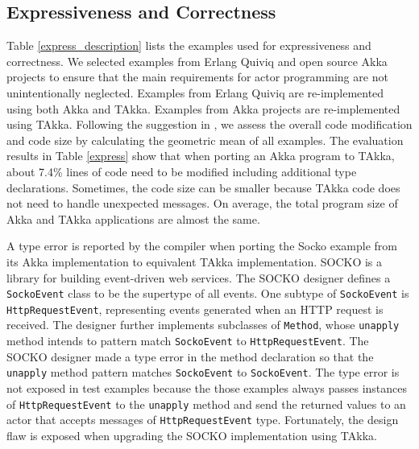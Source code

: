 \subsection{Expressiveness and Correctness}
\label{expressiveness}
Table \ref{express_description} lists the examples used for expressiveness and 
correctness.  We selected examples from Erlang Quiviq \cite{quviq}
and open source Akka projects to ensure that the main requirements for actor 
programming are not unintentionally neglected.  Examples from Erlang 
Quiviq are re-implemented using both Akka and TAkka.  Examples from 
Akka projects are re-implemented using TAkka.  Following the suggestion in  
\cite{HePa06}, we assess the overall code modification and code 
size by calculating the geometric mean of all examples. The evaluation results 
in Table \ref{express} show that when porting an Akka program to TAkka, about 
7.4\% lines of code need to be modified including additional type declarations. 
Sometimes, the code size can be smaller because TAkka code does not 
need to handle unexpected messages.  On average, the total program size 
of Akka and TAkka applications are almost the same.

A type error is reported by the compiler when porting the Socko example 
\cite{SOCKO} from its Akka implementation to equivalent TAkka implementation.
SOCKO is a library for building event-driven web services.  The SOCKO designer
defines a {\tt SockoEvent} class to be the supertype of all events.  One
subtype of {\tt SockoEvent} is {\tt HttpRequestEvent}, representing events
generated when an HTTP request is received. The designer further implements
subclasses of {\tt Method}, whose {\tt unapply} method intends to pattern
match {\tt SockoEvent} to {\tt HttpRequestEvent}.  The SOCKO
designer made a type error in the method declaration so that the {\tt unapply}
method pattern matches {\tt SockoEvent} to {\tt SockoEvent}. The type error is
not exposed in test examples because the those examples always passes instances 
of {\tt HttpRequestEvent} to the {\tt unapply} method and send the returned
values to an actor that accepts messages of {\tt HttpRequestEvent} type.
Fortunately, the design flaw is exposed when upgrading the SOCKO implementation 
using TAkka.

